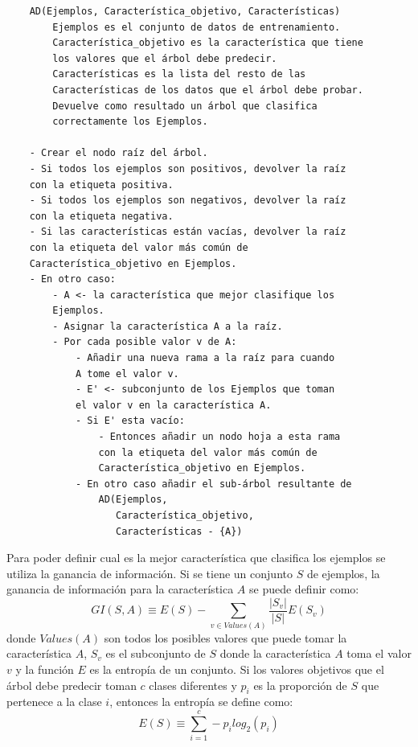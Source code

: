 \begin{verbatim}
    AD(Ejemplos, Característica_objetivo, Características)
        Ejemplos es el conjunto de datos de entrenamiento.
        Característica_objetivo es la característica que tiene
        los valores que el árbol debe predecir.
        Características es la lista del resto de las
        Características de los datos que el árbol debe probar.
        Devuelve como resultado un árbol que clasifica
        correctamente los Ejemplos.

    - Crear el nodo raíz del árbol.
    - Si todos los ejemplos son positivos, devolver la raíz
    con la etiqueta positiva.
    - Si todos los ejemplos son negativos, devolver la raíz
    con la etiqueta negativa.
    - Si las características están vacías, devolver la raíz
    con la etiqueta del valor más común de
    Característica_objetivo en Ejemplos.
    - En otro caso:
        - A <- la característica que mejor clasifique los
        Ejemplos.
        - Asignar la característica A a la raíz.
        - Por cada posible valor v de A:
            - Añadir una nueva rama a la raíz para cuando
            A tome el valor v.
            - E' <- subconjunto de los Ejemplos que toman
            el valor v en la característica A.
            - Si E' esta vacío:
                - Entonces añadir un nodo hoja a esta rama
                con la etiqueta del valor más común de
                Característica_objetivo en Ejemplos.
            - En otro caso añadir el sub-árbol resultante de
                AD(Ejemplos, 
                   Característica_objetivo, 
                   Características - {A})
\end{verbatim}

Para poder definir cual es la mejor característica que clasifica los ejemplos se utiliza la ganancia de información. Si se tiene un conjunto $S$ de ejemplos, la ganancia de información para la característica $A$ se puede definir como:
\[GI(S, A) \equiv E(S) - \sum_{v \in Values(A)} \frac{|S_{v}|}{|S|}E(S_{v})\]
donde $Values(A)$ son todos los posibles valores que puede tomar la característica $A$, $S_{v}$ es el subconjunto de $S$ donde la característica $A$ toma el valor $v$ y la función $E$ es la entropía de un conjunto. Si los valores objetivos que el árbol debe predecir toman $c$ clases diferentes y $p_{i}$ es la proporción de $S$ que pertenece a la clase $i$, entonces la entropía se define como:
\[E(S) \equiv \sum_{i=1}^c -p_{i}log_{2}(p_{i})\]

